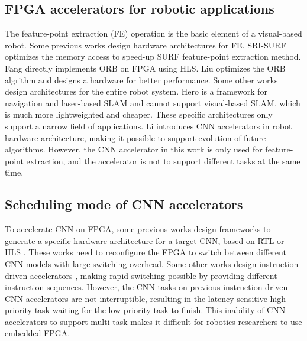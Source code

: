 \subsection{ FPGA accelerators for robotic applications }

The feature-point extraction (FE) operation is the basic element of a visual-based robot.
Some previous works design hardware architectures for FE.
SRI-SURF \cite{jia2016sri} optimizes the memory access to speed-up SURF \cite{bay2006surf} feature-point extraction method. 
Fang \cite{fang2017fpga} directly implements ORB on FPGA using HLS. Liu \cite{liu2019eslam} optimizes the ORB algrithm and designs a hardware for better performance.
Some other works design architectures for the entire robot system. Hero \cite{shi2018hero} is a framework for navigation and laser-based SLAM and cannot support visual-based SLAM, which is much more lightweighted and cheaper. These specific architectures only support a narrow field of applications. 
Li \cite{li2019879gops} introduces CNN accelerators in robot hardware architecture, making it possible to support evolution of future algorithms. 
However, the CNN accelerator in this work\cite{li2019879gops} is only used for feature-point extraction, and the accelerator is not to support different tasks at the same time.



\subsection{ Scheduling mode of CNN accelerators }

To accelerate CNN on FPGA, some previous works design frameworks to generate a specific hardware architecture for a target CNN, based on  RTL \cite{li_high_2016} or HLS \cite{lu_evaluating_2017}. These works need to reconfigure the FPGA to switch between different CNN models with large switching overhead. Some other works design instruction-driven accelerators \cite{yu2018instruction,qiu2016going,guo2017angel}, making rapid switching possible by providing different instruction sequences. 
However, the CNN tasks on previous instruction-driven CNN accelerators are not interruptible, resulting in the latency-sensitive high-priority task waiting for the low-priority task to finish. This inability of CNN accelerators to support multi-task makes it difficult for robotics researchers to use embedded FPGA.


